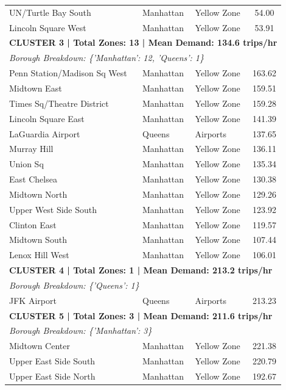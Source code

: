 \documentclass[11pt,a4paper]{article}
\begin{document}
\begin{table}[htbp]
\begin{tabular}{lllc}
        UN/Turtle Bay South & Manhattan & Yellow Zone & 54.00 \\
        Lincoln Square West & Manhattan & Yellow Zone & 53.91 \\
        \midrule
        \multicolumn{4}{l}{\textbf{CLUSTER 3 | Total Zones: 13 | Mean Demand: 134.6 trips/hr}} \\
        \multicolumn{4}{l}{\textit{Borough Breakdown: \{'Manhattan': 12, 'Queens': 1\}}} \\
        \midrule
        Penn Station/Madison Sq West & Manhattan & Yellow Zone & 163.62 \\
        Midtown East & Manhattan & Yellow Zone & 159.51 \\
        Times Sq/Theatre District & Manhattan & Yellow Zone & 159.28 \\
        Lincoln Square East & Manhattan & Yellow Zone & 141.39 \\
        LaGuardia Airport & Queens & Airports & 137.65 \\
        Murray Hill & Manhattan & Yellow Zone & 136.11 \\
        Union Sq & Manhattan & Yellow Zone & 135.34 \\
        East Chelsea & Manhattan & Yellow Zone & 130.38 \\
        Midtown North & Manhattan & Yellow Zone & 129.26 \\
        Upper West Side South & Manhattan & Yellow Zone & 123.92 \\
        Clinton East & Manhattan & Yellow Zone & 119.57 \\
        Midtown South & Manhattan & Yellow Zone & 107.44 \\
        Lenox Hill West & Manhattan & Yellow Zone & 106.01 \\
        \midrule
        \multicolumn{4}{l}{\textbf{CLUSTER 4 | Total Zones: 1 | Mean Demand: 213.2 trips/hr}} \\
        \multicolumn{4}{l}{\textit{Borough Breakdown: \{'Queens': 1\}}} \\
        \midrule
        JFK Airport & Queens & Airports & 213.23 \\
        \midrule
        \multicolumn{4}{l}{\textbf{CLUSTER 5 | Total Zones: 3 | Mean Demand: 211.6 trips/hr}} \\
        \multicolumn{4}{l}{\textit{Borough Breakdown: \{'Manhattan': 3\}}} \\
        \midrule
        Midtown Center & Manhattan & Yellow Zone & 221.38 \\
        Upper East Side South & Manhattan & Yellow Zone & 220.79 \\
        Upper East Side North & Manhattan & Yellow Zone & 192.67 \\
        \bottomrule
    \end{tabular}
\end{table}
\end{document}
